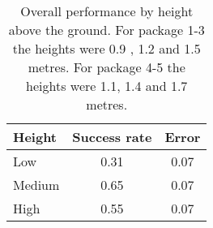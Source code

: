 \begin{table}[H]
\centering
\begin{tabular}{@{} l *2c @{}}
\toprule
Height & Success rate & Error\\
\midrule
 Low 		& 0.31 & 0.07\\
 Medium 	& 0.65 & 0.07\\
 High		& 0.55 & 0.07\\

\bottomrule
 \end{tabular}
 \caption{Overall performance by height above the ground. For package 1-3 the heights were 0.9 , 1.2 and 1.5 metres. For package 4-5 the heights were 1.1, 1.4 and 1.7 metres.} 
\label{table:measurement_by_height}
\end{table}